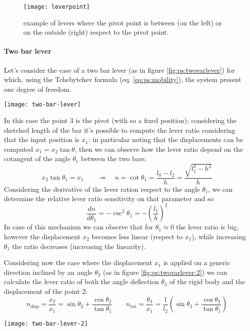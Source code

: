 		\begin{figure}[bht]
			\centering \texttt{[image: leverpoint]}
			\caption{example of levers where the pivot point is between (on the left) or on the outside (right) respect to the pivot point.}
			\label{fig:ps:leverpoint}
		\end{figure}
	
		\paragraph{Two bar lever} Let's consider the case of a two bar lever (as in figure \ref{fig:ps:twovarlever}) for which, using the Tchebytchev formula (eq. \ref{eq:ps:mobility}), the system present one degree of freedom.
		
		\begin{SCfigure}[2][b]
			\centering
			\texttt{[image: two-bar-lever]}
			\caption{schematic representation (with main design parameters) of a two bar lever.} \label{fig:ps:twovarlever}
		\end{SCfigure}
		In this case the point $3$ is the pivot (with so a fixed position); considering the sketched length of the bar it's possible to compute the lever ratio considering that the input position is $x_1$; in particular noting that the displacements can be computed $x_1 = x_2\tan\theta$, then we can observe how the lever ratio depend on the cotangent of the angle $\theta_1$ between the two bars:
		\[ x_2 \tan \theta_1 = x_1 \qquad \Rightarrow \quad n = \cot\theta_1 = \frac{l_0-l_2}{h} = \frac{\sqrt{l_1^2-h^2}}{h} \]
		Considering the derivative of the lever ration respect to the angle $\theta_1$, we can determine the relative lever ratio sensitivity on that parameter and so
		\[ \frac{dn}{d\theta_1} = - \csc^2 \theta_1 = - \left( \frac{l_1}{h} \right)^2 \]
		In case of this mechanism we can observe that for $\theta_1 \simeq 0$ the lever ratio is big, however the displacement $x_2$ becomes less linear (respect to $x_1$), while increasing $\theta_1$ the ratio decreases (increasing the linearity). \vspace{3mm}
		
		Considering now the case where the displacement $x_1$ is applied on a generic direction inclined by an angle $\theta_2$ (as in figure \ref{fig:ps:twovarlever-2}) we can calculate the lever ratio of both the angle deflection $\theta_3$ of the rigid body and the displacement of the point 2:
		\[ n_\textrm{disp} = \frac{x_2}{x_1} = \sin\theta_2 + \frac{\cos \theta_2}{\tan\theta_1} \qquad n_\textrm{rot} = \frac{\theta_3}{x_1} = \frac 1 {l_2} \left( \sin\theta_2 + \frac{\cos\theta_2}{\tan\theta_1} \right)\]
		\begin{SCfigure}[2][b]
			\centering
			\texttt{[image: two-bar-lever-2]}
			\caption{schematic representation (with main design parameters) of a two bar lever with a general input displacement angle $\theta_2$.} \label{fig:ps:twovarlever-2}
		\end{SCfigure}
	
